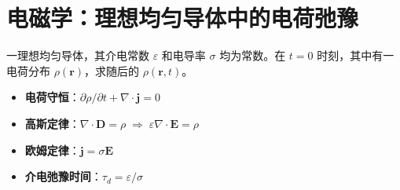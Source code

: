 \section{电磁学：理想均匀导体中的电荷弛豫}
\label{sec:charge-relaxation}

\begin{modelbox}[题目：导体中空间电荷的时间演化]
一理想均匀导体，其介电常数 $\varepsilon$ 和电导率 $\sigma$ 均为常数。在 $t=0$ 时刻，其中有一电荷分布 $\rho(\bm{r})$，求随后的 $\rho(\bm{r},t)$。
\end{modelbox}

\begin{tipbox}[考点快速分析]
\begin{itemize}
    \item \textbf{电荷守恒}：$\partial\rho/\partial t+\nabla\cdot\bm{j}=0$
    \item \textbf{高斯定律}：$\nabla\cdot\bm{D}=\rho\;\Rightarrow\;\varepsilon\nabla\cdot\bm{E}=\rho$
    \item \textbf{欧姆定律}：$\bm{j}=\sigma\bm{E}$
    \item \textbf{介电弛豫时间}：$\tau_d=\varepsilon/\sigma$
\end{itemize}
\end{tipbox}

